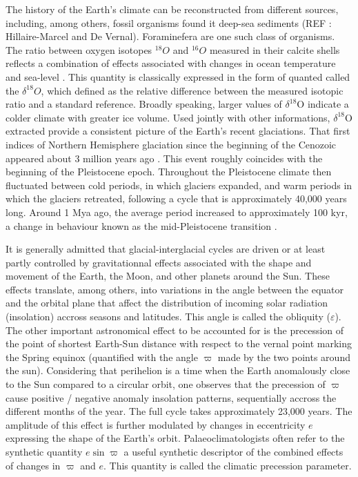 \documentclass[a4paper,12pt]{article}
\begin{document}
The history of the Earth's climate can be reconstructed from different sources, 
including, among others, fossil organisms found it deep-sea sediments (REF : Hillaire-Marcel and 
De Vernal). Foraminefera are one such class of organisms. 
The ratio between oxygen isotopes $^{18}O$ and $^{16}O$ measured in their calcite shells
reflects a combination of effects associated with changes in ocean temperature and sea-level 
\cite{emiliani55, shackleton67}. 
This quantity is classically expressed in the form of quanted called the $\delta^{18}O$, which defined as the relative 
difference between the measured isotopic ratio and a standard reference.
Broadly speaking, larger values of $\delta^{18}$O 
indicate a colder climate with greater ice volume.
Used jointly with other informations, $\delta^{18}$O extracted provide a consistent picture of the Earth's recent glaciations.
That first indices of Northern Hemisphere glaciation since the beginning of the Cenozoic appeared  about 3 million
years ago \cite{Shackleton84ab}. This event roughly coincides with the beginning of the Pleistocene epoch. 
Throughout the Pleistocene climate then fluctuated between cold periods, in which glaciers expanded, and warm
periods in which the glaciers retreated, following a cycle that is approximately 40,000 years long. 
Around 1 Mya ago, the average period increased to approximately  100 kyr, a change in behaviour known as
the mid-Pleistocene transition \cite{Ruddiman86}. 

It is generally admitted that glacial-interglacial cycles are driven or at least partly controlled
by gravitationnal effects associated  with the shape and movement of the Earth, the Moon, and other planets 
around the Sun.
These effects translate, among others, into variations in 
the angle between the equator and the orbital plane that affect the distribution of incoming solar radiation (insolation)
accross seasons and latitudes. This angle is called the obliquity ($\varepsilon$). 
The other important astronomical effect to be accounted for is
the precession of the point of shortest Earth-Sun distance with respect to the vernal point marking the Spring
equinox (quantified with the angle $\varpi$ made by the two points around the sun).
Considering that perihelion is a time when the Earth anomalously close to the Sun compared to a circular orbit, one observes that
the precession of $\varpi$ cause positive / negative anomaly insolation patterns, sequentially accross the different months of the year. The full cycle takes
approximately 23,000 years. The amplitude of this effect is further modulated by changes
in eccentricity $e$ expressing the shape of the Earth's orbit. Palaeoclimatologists often refer to the synthetic quantity $e\sin\varpi$
a useful synthetic descriptor of the combined effects of changes in $\varpi$ and $e$. This quantity is called the climatic precession parameter. 
\end{document}
